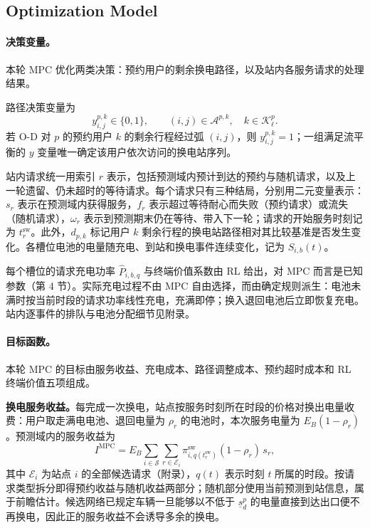 \documentclass[12pt,a4paper,UTF8]{ctexart}
\begin{document}
\subsection{Optimization Model}


\paragraph{决策变量。}
本轮 MPC 优化两类决策：预约用户的剩余换电路径，以及站内各服务请求的处理结果。

路径决策变量为
\[
y_{i,j}^{p,k}\in\{0,1\},
\qquad
(i,j)\in\mathcal A^{p,k},
\quad
k\in\mathcal K_\ell^p.
\]
若 O-D 对 $p$ 的预约用户 $k$ 的剩余行程经过弧 $(i,j)$，则 $y_{i,j}^{p,k}=1$；一组满足流平衡的 $y$ 变量唯一确定该用户依次访问的换电站序列。

站内请求统一用索引 $r$ 表示，包括预测域内预计到达的预约与随机请求，以及上一轮遗留、仍未超时的等待请求。每个请求只有三种结局，分别用二元变量表示：$s_r$ 表示在预测域内获得服务，$f_r$ 表示超过等待耐心而失败（预约请求）或流失（随机请求），$\omega_r$ 表示到预测期末仍在等待、带入下一轮；请求的开始服务时刻记为 $t_r^{\mathrm{sw}}$。此外，$d_{p,k}$ 标记用户 $k$ 剩余行程的换电站路径相对其比较基准是否发生变化。各槽位电池的电量随充电、到站和换电事件连续变化，记为 $S_{i,b}(t)$。

每个槽位的请求充电功率 $\widehat P_{i,b,q}$ 与终端价值系数由 RL 给出，对 MPC 而言是已知参数（第 4 节）。实际充电过程不由 MPC 自由选择，而由确定规则派生：电池未满时按当前时段的请求功率线性充电，充满即停；换入退回电池后立即恢复充电。站内逐事件的排队与电池分配细节见附录。

\paragraph{目标函数。}
本轮 MPC 的目标由服务收益、充电成本、路径调整成本、预约超时成本和 RL 终端价值五项组成。

\textbf{换电服务收益。}每完成一次换电，站点按服务时刻所在时段的价格对换出电量收费：用户取走满电电池、退回电量为 $\rho_r$ 的电池时，本次服务电量为 $E_B(1-\rho_r)$。预测域内的服务收益为
\begin{equation}
I^{\mathrm{MPC}}
=E_B\sum_{i\in\mathcal S}
\sum_{r\in\mathcal E_i}
\pi_{i,q(t_r^{\mathrm{sw}})}^{\mathrm{sw}}(1-\rho_r)\,s_r,
\label{eq:income}
\end{equation}
其中 $\mathcal E_i$ 为站点 $i$ 的全部候选请求（附录），$q(t)$ 表示时刻 $t$ 所属的时段。按请求类型拆分即得预约收益与随机收益两部分；随机部分使用当前预测到站信息，属于前瞻估计。候选网络已规定车辆一旦能够以不低于 $\underline s_d^p$ 的电量直接到达出口便不再换电，因此正的服务收益不会诱导多余的换电。
\end{document}
